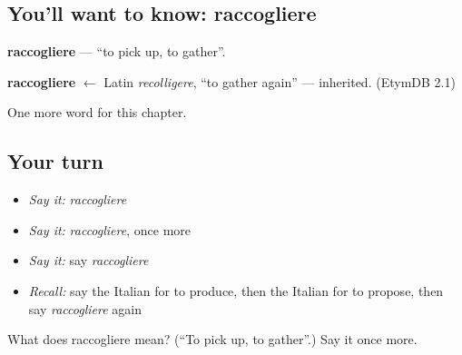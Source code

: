 \subsection*{You'll want to know: raccogliere}
\textbf{raccogliere} — \textquotedblleft{}to pick up, to gather\textquotedblright{}.

\begin{cousinweb}
\textbf{raccogliere} $\leftarrow$ Latin \emph{recolligere}, \textquotedblleft{}to gather again\textquotedblright{} — inherited. (EtymDB 2.1)
\end{cousinweb}

\begin{grammarlens}[title={What you've built}]
One more word for this chapter.
\end{grammarlens}

\subsection*{Your turn}
\begin{itemize}
\raggedright
  \item \emph{Say it:} \emph{raccogliere}
  \item \emph{Say it:} \emph{raccogliere}, once more
  \item \emph{Say it:} say \emph{raccogliere}
  \item \emph{Recall:} say the Italian for to produce, then the Italian for to propose, then say \emph{raccogliere} again
\end{itemize}

\begin{tcolorbox}[breakable,colback=teal!4,colframe=teal!35!black,title={Before you move on}]
What does raccogliere mean? (\textquotedblleft{}To pick up, to gather\textquotedblright{}.) Say it once more.
\end{tcolorbox}
